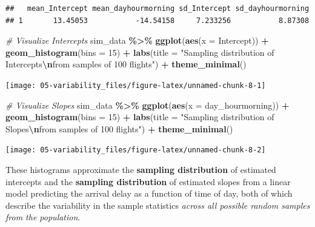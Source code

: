 \documentclass[
]{book}
\newenvironment{Shaded}{\begin{snugshade}}{\end{snugshade}}
\newcommand{\AttributeTok}[1]{\textcolor[rgb]{0.13,0.29,0.53}{#1}}
\newcommand{\CommentTok}[1]{\textcolor[rgb]{0.56,0.35,0.01}{\textit{#1}}}
\newcommand{\DecValTok}[1]{\textcolor[rgb]{0.00,0.00,0.81}{#1}}
\newcommand{\FunctionTok}[1]{\textcolor[rgb]{0.13,0.29,0.53}{\textbf{#1}}}
\newcommand{\NormalTok}[1]{#1}
\newcommand{\SpecialCharTok}[1]{\textcolor[rgb]{0.81,0.36,0.00}{\textbf{#1}}}
\newcommand{\StringTok}[1]{\textcolor[rgb]{0.31,0.60,0.02}{#1}}
\begin{document}
\begin{verbatim}
##   mean_Intercept mean_dayhourmorning sd_Intercept sd_dayhourmorning
## 1       13.45053           -14.54158     7.233256           8.87308
\end{verbatim}

\begin{Shaded}
\begin{Highlighting}[]
\CommentTok{\# Visualize Intercepts}
\NormalTok{sim\_data }\SpecialCharTok{\%\textgreater{}\%} 
    \FunctionTok{ggplot}\NormalTok{(}\FunctionTok{aes}\NormalTok{(}\AttributeTok{x =}\NormalTok{ Intercept)) }\SpecialCharTok{+}
    \FunctionTok{geom\_histogram}\NormalTok{(}\AttributeTok{bins =} \DecValTok{15}\NormalTok{) }\SpecialCharTok{+}
    \FunctionTok{labs}\NormalTok{(}\AttributeTok{title =} \StringTok{"Sampling distribution of Intercepts}\SpecialCharTok{\textbackslash{}n}\StringTok{from samples of 100 flights"}\NormalTok{) }\SpecialCharTok{+}
    \FunctionTok{theme\_minimal}\NormalTok{()}
\end{Highlighting}
\end{Shaded}

\begin{center}\texttt{[image: 05-variability\_files/figure-latex/unnamed-chunk-8-1]} \end{center}

\begin{Shaded}
\begin{Highlighting}[]
\CommentTok{\# Visualize Slopes}
\NormalTok{sim\_data }\SpecialCharTok{\%\textgreater{}\%} 
    \FunctionTok{ggplot}\NormalTok{(}\FunctionTok{aes}\NormalTok{(}\AttributeTok{x =}\NormalTok{ day\_hourmorning)) }\SpecialCharTok{+}
    \FunctionTok{geom\_histogram}\NormalTok{(}\AttributeTok{bins =} \DecValTok{15}\NormalTok{) }\SpecialCharTok{+}
    \FunctionTok{labs}\NormalTok{(}\AttributeTok{title =} \StringTok{"Sampling distribution of Slopes}\SpecialCharTok{\textbackslash{}n}\StringTok{from samples of 100 flights"}\NormalTok{) }\SpecialCharTok{+}
    \FunctionTok{theme\_minimal}\NormalTok{()}
\end{Highlighting}
\end{Shaded}

\begin{center}\texttt{[image: 05-variability\_files/figure-latex/unnamed-chunk-8-2]} \end{center}

These histograms approximate the \textbf{sampling distribution} of estimated intercepts and the \textbf{sampling distribution} of estimated slopes from a linear model predicting the arrival delay as a function of time of day, both of which describe the variability in the sample statistics \emph{across all possible random samples from the population}.
\end{document}
